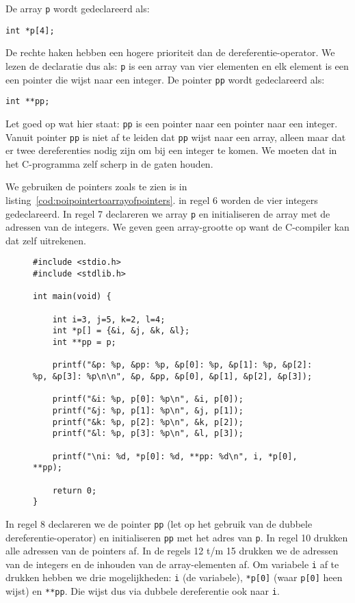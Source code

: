 De array \texttt{p} wordt gedeclareerd als:

\hspace*{1em}\texttt{int *p[4];}

De rechte haken hebben een hogere prioriteit dan de dereferentie-operator. We lezen de declaratie dus als: \texttt{p} is een array van vier elementen en elk element is een een pointer die wijst naar een integer. De pointer \texttt{pp} wordt gedeclareerd als:

\hspace*{1em}\texttt{int **pp;}

Let goed op wat hier staat: \texttt{pp} is een pointer naar een pointer naar een integer. Vanuit pointer \texttt{pp} is niet af te leiden dat \texttt{pp} wijst naar een array, alleen maar dat er twee dereferenties nodig zijn om bij een integer te komen. We moeten dat in het C-programma zelf scherp in de gaten houden.

We gebruiken de pointers zoals te zien is in listing~\ref{cod:poipointertoarrayofpointers}. in regel 6 worden de vier integers gedeclareerd. In regel 7 declareren we array \texttt{p} en initialiseren de array met de adressen van de integers. We geven geen array-grootte op want de C-compiler kan dat zelf uitrekenen.

\begin{figure}[!ht]
\begin{lstlisting}[caption=Voorbeeld van het gebruik van pointers.,label=cod:poipointertoarrayofpointers]
#include <stdio.h>
#include <stdlib.h>

int main(void) {

    int i=3, j=5, k=2, l=4;
    int *p[] = {&i, &j, &k, &l};
    int **pp = p;

    printf("&p: %p, &pp: %p, &p[0]: %p, &p[1]: %p, &p[2]: %p, &p[3]: %p\n\n", &p, &pp, &p[0], &p[1], &p[2], &p[3]);

    printf("&i: %p, p[0]: %p\n", &i, p[0]);
    printf("&j: %p, p[1]: %p\n", &j, p[1]);
    printf("&k: %p, p[2]: %p\n", &k, p[2]);
    printf("&l: %p, p[3]: %p\n", &l, p[3]);

    printf("\ni: %d, *p[0]: %d, **pp: %d\n", i, *p[0], **pp);

    return 0;
}
\end{lstlisting}
\end{figure}

In regel 8 declareren we de pointer \texttt{pp} (let op het gebruik van de dubbele dereferentie-operator) en initialiseren \texttt{pp} met het adres van \texttt{p}. In regel 10 drukken alle adressen van de pointers af. In de regels 12 t/m 15 drukken we de adressen van de integers en de inhouden van de array-elementen af. Om variabele \texttt{i} af te drukken hebben we drie mogelijkheden: \texttt{i} (de variabele), \texttt{*p[0]} (waar \texttt{p[0]} heen wijst) en \texttt{**pp}. Die wijst dus via dubbele dereferentie ook naar \texttt{i}.

